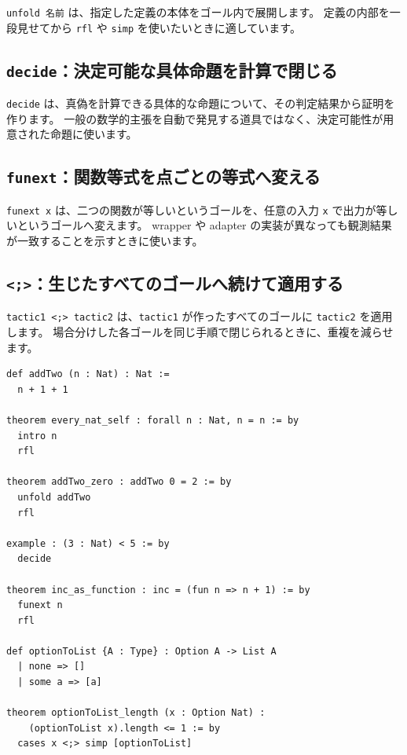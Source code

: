 \texttt{unfold 名前} は、指定した定義の本体をゴール内で展開します。
定義の内部を一段見せてから \texttt{rfl} や \texttt{simp} を使いたいときに適しています。

\subsection{\texttt{decide}：決定可能な具体命題を計算で閉じる}

\texttt{decide} は、真偽を計算できる具体的な命題について、その判定結果から証明を作ります。
一般の数学的主張を自動で発見する道具ではなく、決定可能性が用意された命題に使います。

\subsection{\texttt{funext}：関数等式を点ごとの等式へ変える}

\texttt{funext x} は、二つの関数が等しいというゴールを、任意の入力 \texttt{x} で出力が等しいというゴールへ変えます。
wrapper や adapter の実装が異なっても観測結果が一致することを示すときに使います。

\subsection{\texttt{<;>}：生じたすべてのゴールへ続けて適用する}

\texttt{tactic1 <;> tactic2} は、\texttt{tactic1} が作ったすべてのゴールに \texttt{tactic2} を適用します。
場合分けした各ゴールを同じ手順で閉じられるときに、重複を減らせます。

\begin{listing}[htbp]
\begin{verbatim}
def addTwo (n : Nat) : Nat :=
  n + 1 + 1

theorem every_nat_self : forall n : Nat, n = n := by
  intro n
  rfl

theorem addTwo_zero : addTwo 0 = 2 := by
  unfold addTwo
  rfl

example : (3 : Nat) < 5 := by
  decide

theorem inc_as_function : inc = (fun n => n + 1) := by
  funext n
  rfl

def optionToList {A : Type} : Option A -> List A
  | none => []
  | some a => [a]

theorem optionToList_length (x : Option Nat) :
    (optionToList x).length <= 1 := by
  cases x <;> simp [optionToList]
\end{verbatim}
\caption{\texttt{intro}・\texttt{unfold}・\texttt{decide}・\texttt{funext}・\texttt{<;>}}
\label{lst:appA_goal_operations}
\end{listing}

